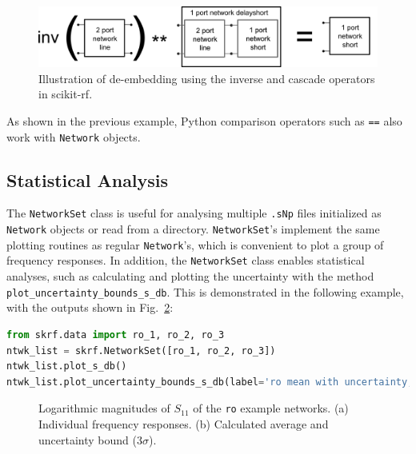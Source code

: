 \documentclass[10pt, letterpaper]{scrartcl}
\newcommand{\skrf}{{s}cikit-rf\xspace}
\begin{document}
\begin{figure}
	\centering
	\includegraphics[width=0.9\linewidth]{figures/deembedding.png}
	\caption{Illustration of de-embedding using the inverse and cascade operators in \skrf{}.}
	\label{fig:deembedding}
\end{figure}

As shown in the previous example, Python comparison operators such as \texttt{==} also work with \texttt{Network} objects. 

\subsection{Statistical Analysis}
The \texttt{NetworkSet} class is useful for analysing multiple \texttt{.sNp} files initialized as \texttt{Network} objects or read from a directory. \texttt{NetworkSet}'s implement the same plotting routines as regular \texttt{Network}'s, which is convenient to plot a group of frequency responses. In addition, the \texttt{NetworkSet} class enables statistical analyses, such as calculating and plotting the uncertainty with the method \texttt{plot\_uncertainty\_bounds\_s\_db}. This is demonstrated in the following example, with the outputs shown in Fig.~\ref{fig:networkset}:

\begin{lstlisting}[language=Python]
from skrf.data import ro_1, ro_2, ro_3
ntwk_list = skrf.NetworkSet([ro_1, ro_2, ro_3])
ntwk_list.plot_s_db()
ntwk_list.plot_uncertainty_bounds_s_db(label='ro mean with uncertainty, S11')
\end{lstlisting}

\begin{figure}
	\centering
	\caption{Logarithmic magnitudes of $S_{11}$ of the \texttt{ro} example networks. (a) Individual frequency responses. (b) Calculated average and uncertainty bound ($3 \sigma$).}
	\label{fig:networkset}
\end{figure}
\end{document}
